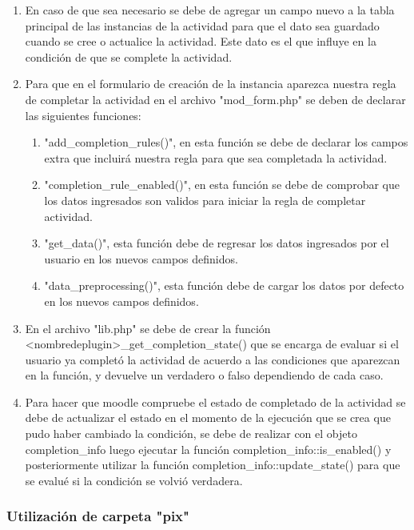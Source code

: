       \begin{enumerate}
        \item En caso de que sea necesario se debe de agregar un campo nuevo a la tabla principal de las instancias de la actividad para que el dato sea guardado cuando se cree o actualice la actividad. Este dato es el que influye en la condición de que se complete la actividad.
        \item Para que en el formulario de creación de la instancia aparezca nuestra regla de completar la actividad en el archivo "mod\_form.php" se deben de declarar las siguientes funciones:

        \begin{enumerate}
          \item "add\_completion\_rules()", en esta función se debe de declarar los campos extra que incluirá nuestra regla para que sea completada la actividad.
          \item "completion\_rule\_enabled()", en esta función se debe de comprobar que los datos ingresados son validos para iniciar la regla de completar actividad.
          \item "get\_data()", esta función debe de regresar los datos ingresados por el usuario en los nuevos campos definidos.
          \item "data\_preprocessing()", esta función debe de cargar los datos por defecto en los nuevos campos definidos.
        \end{enumerate}

        \item En el archivo "lib.php" se debe de crear la función <nombredeplugin>\_get\_completion\_state() que se encarga de evaluar si el usuario ya completó la actividad de acuerdo a las condiciones que aparezcan en la función, y devuelve un verdadero o falso dependiendo de cada caso.
        \item Para hacer que moodle compruebe el estado de completado de la actividad se debe de actualizar el estado en el momento de la ejecución que se crea que pudo haber cambiado la condición, se debe de realizar con el objeto completion\_info luego ejecutar la función completion\_info::is\_enabled() y posteriormente utilizar la función completion\_info::update\_state() para que se evalué si la condición se volvió verdadera.

      \end{enumerate}


  \subsubsection{Utilización de carpeta "pix"}

